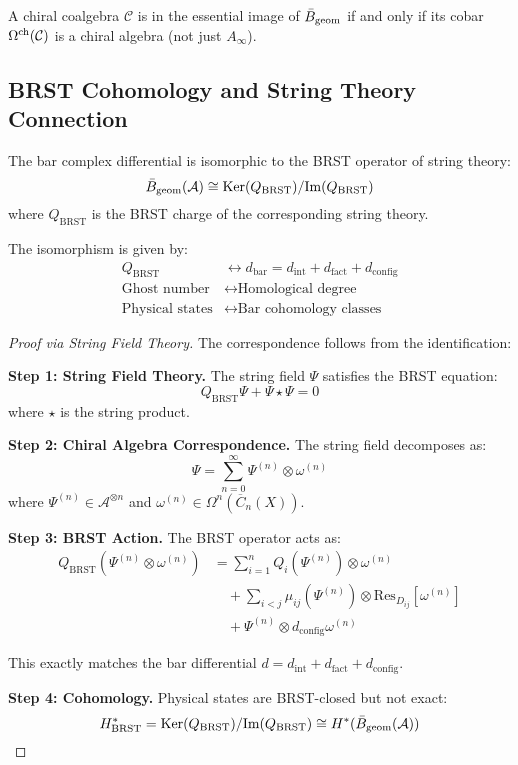 \begin{corollary}
A chiral coalgebra $\mathcal{C}$ is in the essential image of $\bar{B}_{\text{geom}}$ if and only if its cobar $\Omega^{\text{ch}}(\mathcal{C})$ is a chiral algebra (not just $A_\infty$).
\end{corollary}

\subsection{BRST Cohomology and String Theory Connection}

\begin{theorem}\label{thm:brst-cohomology}
The bar complex differential is isomorphic to the BRST operator of string theory:
$$\bar{B}_{\text{geom}}(\mathcal{A}) \cong \text{Ker}(Q_{\text{BRST}})/\text{Im}(Q_{\text{BRST}})$$
where $Q_{\text{BRST}}$ is the BRST charge of the corresponding string theory.

The isomorphism is given by:
\begin{align}
Q_{\text{BRST}} &\leftrightarrow d_{\text{bar}} = d_{\text{int}} + d_{\text{fact}} + d_{\text{config}} \\
\text{Ghost number} &\leftrightarrow \text{Homological degree} \\
\text{Physical states} &\leftrightarrow \text{Bar cohomology classes}
\end{align}
\end{theorem}

\begin{proof}[Proof via String Field Theory]
The correspondence follows from the identification:

\textbf{Step 1: String Field Theory.} The string field $\Psi$ satisfies the BRST equation:
$$Q_{\text{BRST}} \Psi + \Psi \star \Psi = 0$$
where $\star$ is the string product.

\textbf{Step 2: Chiral Algebra Correspondence.} The string field decomposes as:
$$\Psi = \sum_{n=0}^\infty \Psi^{(n)} \otimes \omega^{(n)}$$
where $\Psi^{(n)} \in \mathcal{A}^{\otimes n}$ and $\omega^{(n)} \in \Omega^n(\overline{C}_n(X))$.

\textbf{Step 3: BRST Action.} The BRST operator acts as:
\begin{align}
Q_{\text{BRST}}(\Psi^{(n)} \otimes \omega^{(n)}) &= \sum_{i=1}^n Q_i(\Psi^{(n)}) \otimes \omega^{(n)} \\
&\quad + \sum_{i<j} \mu_{ij}(\Psi^{(n)}) \otimes \text{Res}_{D_{ij}}[\omega^{(n)}] \\
&\quad + \Psi^{(n)} \otimes d_{\text{config}}\omega^{(n)}
\end{align}

This exactly matches the bar differential $d = d_{\text{int}} + d_{\text{fact}} + d_{\text{config}}$.

\textbf{Step 4: Cohomology.} Physical states are BRST-closed but not exact:
$$H^*_{\text{BRST}} = \text{Ker}(Q_{\text{BRST}})/\text{Im}(Q_{\text{BRST}}) \cong H^*(\bar{B}_{\text{geom}}(\mathcal{A}))$$
\end{proof}

